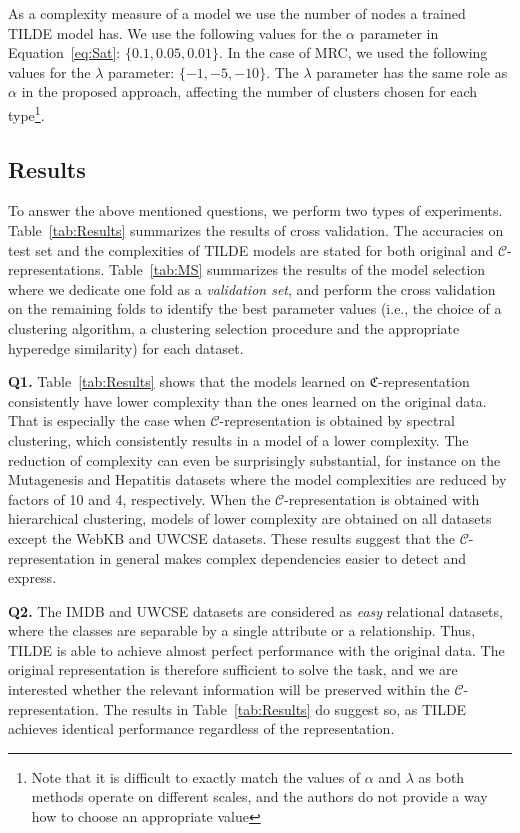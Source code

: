 As a complexity measure of a model we use the number of nodes a trained TILDE model has.
We use the following values for the $\alpha$ parameter in Equation~\ref{eq:Sat}: $\{ 0.1,0.05, 0.01 \}$.
In the case of MRC, we used the following values for the $\lambda$ parameter: $\{-1,-5,-10\}$.
The $\lambda$ parameter has the same role as $\alpha$ in the proposed approach, affecting the number of clusters chosen for each type\footnote{Note that it is difficult to exactly match the values of $\alpha$ and $\lambda$ as both methods operate on different scales, and the authors do not provide a way how to choose an appropriate value}. 




\subsection*{Results}

To answer the above mentioned questions, we perform two types of experiments.
Table~\ref{tab:Results} summarizes the results of cross validation.
The accuracies on test set and the complexities of TILDE models are stated for both original and $\mathcal{C}$-representations.
Table~\ref{tab:MS} summarizes the results of the model selection where we dedicate one fold as a \textit{validation set}, and perform the cross validation on the remaining folds to identify the best parameter values (i.e., the choice of a clustering algorithm, a clustering selection procedure and the appropriate hyperedge similarity) for each dataset.

\textbf{Q1.}
Table~\ref{tab:Results} shows that the models learned on $\mathfrak{C}$-representation consistently have lower complexity than the ones learned on the original data.
That is especially the case when $\mathcal{C}$-representation is obtained by spectral clustering, which consistently results in a model of a lower complexity.
The reduction of complexity can even be surprisingly substantial, for instance on the Mutagenesis and Hepatitis datasets where the model complexities are reduced by factors of 10 and 4, respectively.
When the $\mathcal{C}$-representation is obtained with hierarchical clustering, models of lower complexity are obtained on all datasets except the WebKB and UWCSE datasets.
These results suggest that the $\mathcal{C}$-representation in general makes complex dependencies easier to detect and express.




\textbf{Q2.}
The IMDB and UWCSE datasets are considered as \textit{easy} relational datasets, where the classes are separable by a single attribute or a relationship.
Thus, TILDE is able to achieve almost perfect performance  with the original data.
The original representation is therefore sufficient to solve the task, and we are interested whether  the relevant information will be preserved within the $\mathcal{C}$-representation.
The results in Table~\ref{tab:Results} do suggest so, as TILDE achieves identical performance regardless of the representation.



